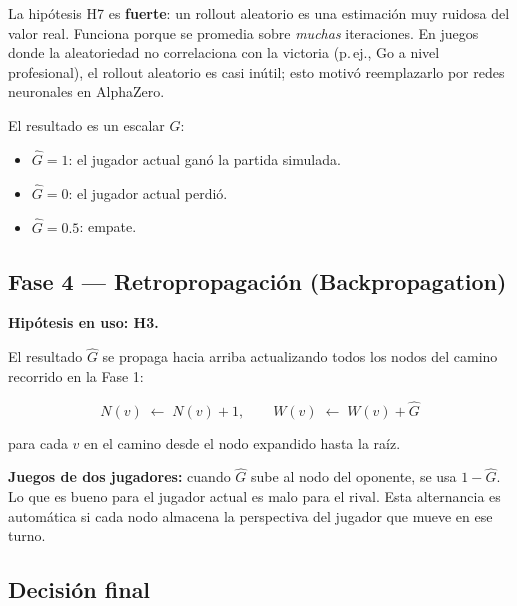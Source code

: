 \documentclass[12pt, a4paper]{article}
\begin{document}
\begin{tcolorbox}[nota]
La hipótesis H7 es \textbf{fuerte}: un rollout aleatorio es una estimación muy
ruidosa del valor real. Funciona porque se promedia sobre \emph{muchas}
iteraciones. En juegos donde la aleatoriedad no correlaciona con la victoria
(p.\,ej., Go a nivel profesional), el rollout aleatorio es casi inútil; esto
motivó reemplazarlo por redes neuronales en AlphaZero.
\end{tcolorbox}

El resultado es un escalar $\hat{G}$:
\begin{itemize}
  \item $\hat{G} = 1$: el jugador actual ganó la partida simulada.
  \item $\hat{G} = 0$: el jugador actual perdió.
  \item $\hat{G} = 0.5$: empate.
\end{itemize}

\subsection{Fase 4 — Retropropagación (Backpropagation)}

\textbf{Hipótesis en uso: H3.}

El resultado $\hat{G}$ se propaga hacia arriba actualizando todos los nodos
del camino recorrido en la Fase 1:

\begin{equation}
  N(v) \;\leftarrow\; N(v) + 1, \qquad
  W(v) \;\leftarrow\; W(v) + \hat{G}
\end{equation}

para cada $v$ en el camino desde el nodo expandido hasta la raíz.

\begin{tcolorbox}[nota]
\textbf{Juegos de dos jugadores:} cuando $\hat{G}$ sube al nodo del oponente,
se usa $1 - \hat{G}$. Lo que es bueno para el jugador actual es malo para el
rival. Esta alternancia es automática si cada nodo almacena la perspectiva
del jugador que mueve en ese turno.
\end{tcolorbox}

\subsection{Decisión final}
\end{document}
